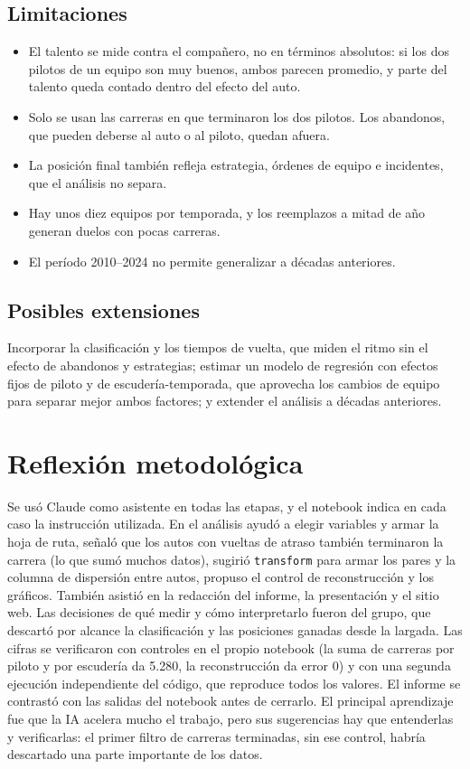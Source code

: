 \documentclass[11pt,a4paper]{article}
\begin{document}
\subsection{Limitaciones}
\begin{itemize}
    \item El talento se mide contra el compañero, no en términos absolutos: si
    los dos pilotos de un equipo son muy buenos, ambos parecen promedio, y
    parte del talento queda contado dentro del efecto del auto.
    \item Solo se usan las carreras en que terminaron los dos pilotos. Los
    abandonos, que pueden deberse al auto o al piloto, quedan afuera.
    \item La posición final también refleja estrategia, órdenes de equipo e
    incidentes, que el análisis no separa.
    \item Hay unos diez equipos por temporada, y los reemplazos a mitad de año
    generan duelos con pocas carreras.
    \item El período 2010--2024 no permite generalizar a décadas anteriores.
\end{itemize}

\subsection{Posibles extensiones}
Incorporar la clasificación y los tiempos de vuelta, que miden el ritmo sin
el efecto de abandonos y estrategias; estimar un modelo de regresión con
efectos fijos de piloto y de escudería-temporada, que aprovecha los cambios de
equipo para separar mejor ambos factores; y extender el análisis a décadas
anteriores.

\section{Reflexión metodológica}
Se usó Claude como asistente en todas las etapas, y el notebook indica en
cada caso la instrucción utilizada. En el análisis ayudó a elegir variables y
armar la hoja de ruta, señaló que los autos con vueltas de atraso también
terminaron la carrera (lo que sumó muchos datos), sugirió \texttt{transform}
para armar los pares y la columna de dispersión entre autos, propuso el
control de reconstrucción y los gráficos. También asistió en la redacción del
informe, la presentación y el sitio web. Las decisiones de qué medir y cómo
interpretarlo fueron del grupo, que descartó por alcance la clasificación y
las posiciones ganadas desde la largada. Las cifras se verificaron con
controles en el propio notebook (la suma de carreras por piloto y por
escudería da 5.280, la reconstrucción da error 0) y con una segunda ejecución
independiente del código, que reproduce todos los valores. El informe se
contrastó con las salidas del notebook antes de cerrarlo. El principal
aprendizaje fue que la IA acelera mucho el trabajo, pero sus sugerencias hay
que entenderlas y verificarlas: el primer filtro de carreras terminadas, sin
ese control, habría descartado una parte importante de los datos.
\end{document}

